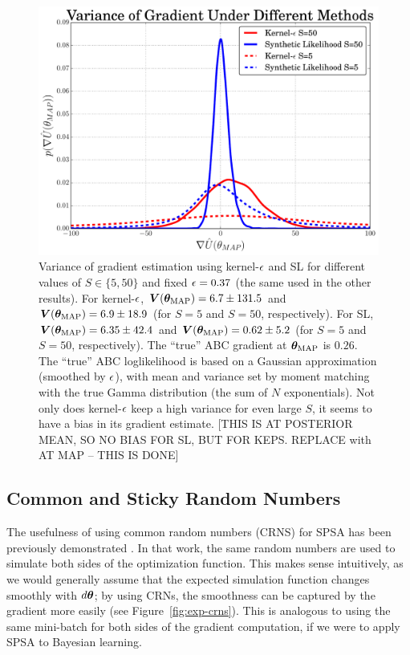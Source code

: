 \documentclass[]{article}
\begin{document}
\begin{figure}[t]
\vskip 0.2in
\begin{center}
\includegraphics[width=0.95\columnwidth]{./images/exp_varg_figure.pdf}
\caption{\small{Variance of gradient estimation using kernel-$\epsilon$ and SL for different values of $S\in\{5,50\}$ and fixed $\epsilon = 0.37$ (the same used in the other results).  For kernel-$\epsilon$, ${\bm V}({\bm \theta}_{\text{MAP}}) = 6.7 \pm 131.5$ and ${\bm V}({\bm \theta}_{\text{MAP}}) = 6.9 \pm 18.9$ (for $S=5$ and $S=50$, respectively).  For SL,${\bm V}({\bm \theta}_{\text{MAP}}) = 6.35 \pm 42.4$ and ${\bm V}({\bm \theta}_{\text{MAP}}) = 0.62 \pm 5.2$ (for $S=5$ and $S=50$, respectively).  The ``true'' ABC gradient at ${\bm \theta}_{\text{MAP}}$ is $0.26$.  The ``true'' ABC loglikelihood is based on a Gaussian approximation (smoothed by $\epsilon$), with mean and variance set by moment matching with the true Gamma distribution (the sum of $N$ exponentials). Not only does kernel-$\epsilon$ keep a high variance for even large $S$, it seems to have a bias in its gradient estimate.  [THIS IS AT POSTERIOR MEAN, SO NO BIAS FOR SL, BUT FOR KEPS.  REPLACE with AT MAP -- THIS IS DONE] }}
\label{fig:exp-varg}
\end{center}
\vskip -0.2in
\end{figure}

\subsection{Common and Sticky Random Numbers}
The usefulness of using common random numbers (CRNS) for SPSA has been previously demonstrated \cite{kleinman1999simulation}.  In that work, the same random numbers are used to simulate both sides of the optimization function.  This makes sense intuitively, as we would generally assume that the expected simulation function changes smoothly with $d {\bm \theta}$;  by using CRNs, the smoothness can be captured by the gradient more easily (see Figure~\ref{fig:exp-crns}).  This is analogous to using the same mini-batch for both sides of the gradient computation, if we were to apply SPSA to Bayesian learning.  
\end{document}

